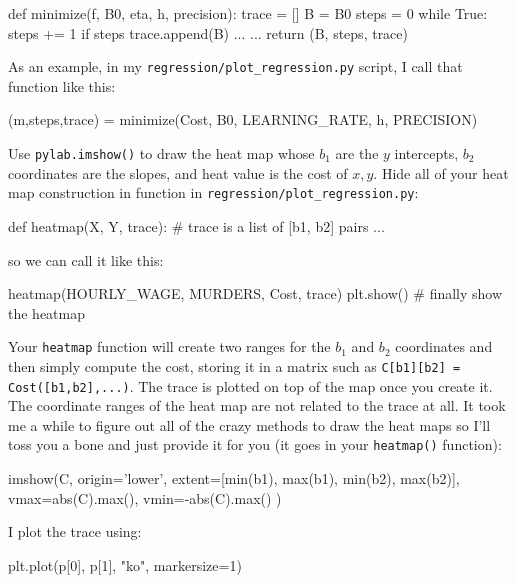\documentclass[titlepage]{tufte-book}
\begin{document}
\begin{fullwidth}
\begin{pyverbatim}
def minimize(f, B0, eta, h, precision):
    trace = []
    B = B0
    steps = 0 
    while True:
        steps += 1
        if steps %
            trace.append(B)
        ...     
    ... 
    return (B, steps, trace)
\end{pyverbatim}

\noindent As an example, in my {\tt regression/plot\_regression.py} script, I call that function like this:

\begin{pyverbatim}
(m,steps,trace) = minimize(Cost, B0, LEARNING_RATE, h, PRECISION)
\end{pyverbatim}

Use {\tt pylab.imshow()} to draw the heat map whose $b_1$ are the $y$ intercepts, $b_2$ coordinates are the slopes, and heat value is the cost of $x,y$.  Hide all of your heat map construction in function in {\tt regression/plot\_regression.py}:

\begin{pyverbatim}
def heatmap(X, Y, trace): # trace is a list of [b1, b2] pairs
    ...
\end{pyverbatim}

\noindent so we can call it like this:

\begin{pyverbatim}
heatmap(HOURLY_WAGE, MURDERS, Cost, trace)
plt.show() # finally show the heatmap
\end{pyverbatim}

Your {\tt heatmap} function will create two ranges for the $b_1$ and $b_2$ coordinates and then simply compute the cost,  storing it in a matrix such as {\tt C[b1][b2] = Cost([b1,b2],...)}.  The trace is plotted on top of the map once you create it. The coordinate ranges of the heat map are not related to the trace at all. It took me a while to figure out all of the crazy methods to draw the heat maps so I'll toss you a bone and just provide it for you (it goes in your {\tt heatmap()} function):

\begin{pyverbatim}
	imshow(C,
		   origin='lower',
		   extent=[min(b1), max(b1), min(b2), max(b2)],
		   vmax=abs(C).max(), vmin=-abs(C).max()
	)
\end{pyverbatim}

\noindent I plot the trace using:

\begin{pyverbatim}
plt.plot(p[0], p[1], "ko", markersize=1)
\end{pyverbatim}


\end{fullwidth}
\end{document}
